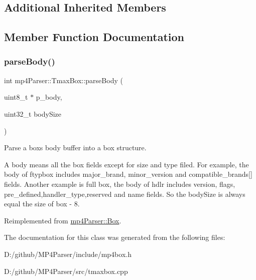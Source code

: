 \subsection*{Additional Inherited Members}


\subsection{Member Function Documentation}
\mbox{\label{classmp4_parser_1_1_tmax_box_ad9fa76bdaab68fa81892d310c8533bad}} 
\subsubsection{\texorpdfstring{parseBody()}{parseBody()}}
{\footnotesize\ttfamily int mp4\+Parser\+::\+Tmax\+Box\+::parse\+Body (\begin{DoxyParamCaption}\item[{uint8\+\_\+t $\ast$}]{p\+\_\+body,  }\item[{uint32\+\_\+t}]{body\+Size }\end{DoxyParamCaption})\hspace{0.3cm}{\ttfamily [virtual]}}



Parse a box\textquotesingle{}s body buffer into a box structure. 

A body means all the box fields except for size and type filed. For example, the body of ftypbox includes major\+\_\+brand, minor\+\_\+version and compatible\+\_\+brands\mbox{[}\mbox{]} fields. Another example is full box, the body of hdlr includes version, flags, pre\+\_\+defined,handler\+\_\+type,reserved and name fields. So the body\+Size is always equal the size of box -\/ 8. 

Reimplemented from \mbox{\hyperlink{classmp4_parser_1_1_box_a3dd0c084ac65bc77b69ac5ecaf796cb2}{mp4\+Parser\+::\+Box}}.



The documentation for this class was generated from the following files\+:\begin{DoxyCompactItemize}
\item 
D\+:/github/\+M\+P4\+Parser/include/mp4box.\+h\item 
D\+:/github/\+M\+P4\+Parser/src/tmaxbox.\+cpp\end{DoxyCompactItemize}
